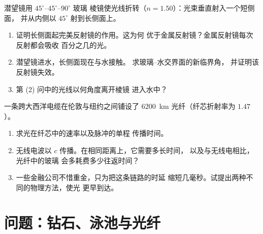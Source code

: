 \begin{exercise}[$\star\star\star$]\label{exo:g10:refraction:14}
潜望镜用 $45^\circ$--$45^\circ$--$90^\circ$ 玻璃
棱镜使光线折转（$n = 1.50$）：光束垂直射入一个短侧面，
并从内侧以 $45^\circ$ 射到长侧面上。
\begin{enumerate}
  \item 证明长侧面起完美反射镜的作用。这为何
        优于金属反射镜？金属反射镜每次反射都会吸收
        百分之几的光。
  \item 潜望镜进水，长侧面现在与水接触。
        求玻璃--水交界面的新临界角，
        并证明该反射镜失效。
  \item 第 (2) 问中的光线以何角度离开棱镜
        进入水中？
\end{enumerate}
\end{exercise}

\begin{exercise}[$\star\star\star$]\label{exo:g10:refraction:15}
一条跨大西洋电缆在伦敦与纽约之间铺设了
\qty{6200}{km} 光纤（纤芯折射率为 $1.47$）。
\begin{enumerate}
  \item 求光在纤芯中的速率以及脉冲的单程
        传播时间。
  \item 无线电波以 $c$ 传播。在相同距离上，它需要多长时间，
        以及与无线电相比，光纤中的玻璃
        会多耗费多少往返时间？
  \item 一些金融公司不惜重金，只为把这条链路的时延
        缩短几毫秒。试提出两种不同的物理方法，使光
        更早到达。
\end{enumerate}
\end{exercise}

\section{问题：钻石、泳池与光纤}

